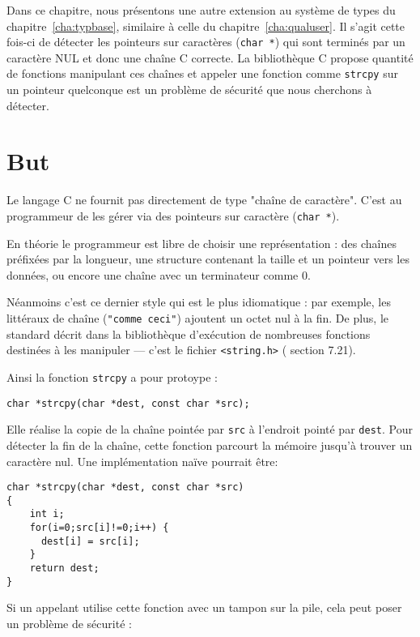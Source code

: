 Dans ce chapitre, nous présentons une autre extension au système de types du
chapitre~\ref{cha:typbase}, similaire à celle du chapitre~\ref{cha:qualuser}.
Il s'agit cette fois-ci de détecter les pointeurs sur caractères (\texttt{char
*}) qui sont terminés par un caractère NUL et donc une chaîne C correcte. La
bibliothèque C propose quantité de fonctions manipulant ces chaînes et appeler
une fonction comme \texttt{strcpy} sur un pointeur quelconque est un problème de
sécurité que nous cherchons à détecter.

\section{But}

Le langage C ne fournit pas directement de type "chaîne de caractère". C'est au
programmeur de les gérer via des pointeurs sur caractère (\texttt{char *}).

En théorie le programmeur est libre de choisir une représentation : des chaînes
préfixées par la longueur, une structure contenant la taille et un pointeur vers
les données, ou encore une chaîne avec un terminateur comme 0.

Néanmoins c'est ce dernier style qui est le plus idiomatique : par exemple, les
littéraux de chaîne (\texttt{"comme ceci"}) ajoutent un octet nul à la fin. De
plus, le standard décrit dans la bibliothèque d'exécution de nombreuses
fonctions destinées à les manipuler --- c'est le fichier
\texttt{\textless{}string.h\textgreater{}} (\cite{AnsiC} section 7.21).

Ainsi la fonction \texttt{strcpy} a pour protoype :

\begin{Verbatim}
char *strcpy(char *dest, const char *src);
\end{Verbatim}

Elle réalise la copie de la chaîne pointée par \texttt{src} à l'endroit pointé
par \texttt{dest}. Pour détecter la fin de la chaîne, cette fonction parcourt la
mémoire jusqu'à trouver un caractère nul. Une implémentation naïve pourrait être:

\begin{Verbatim}
char *strcpy(char *dest, const char *src)
{
    int i;
    for(i=0;src[i]!=0;i++) {
      dest[i] = src[i];
    }
    return dest;
}
\end{Verbatim}

Si un appelant utilise cette fonction avec un tampon sur la pile, cela peut
poser un problème de sécurité :

